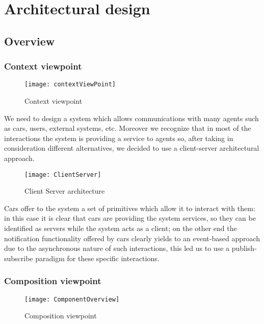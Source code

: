 \section{Architectural design}

\subsection{Overview}
	\subsubsection{Context viewpoint}
	
		\begin{figure}[h]
			\centering
			\texttt{[image: contextViewPoint]}
			\caption{
				\label{fig:contextViewPoint} 
				Context viewpoint
			}
		\end{figure}
		
		We need to design a system which allows communications with many agents such as cars, users, external systems, etc.
		Moreover we recognize that in most of the interactions the system is providing a service to agents so, after taking in consideration different alternatives, we decided to use a client-server architectural approach.

		\begin{figure}[h]
			\centering
			\texttt{[image: ClientServer]}
			\caption{
				\label{fig:ClientServer} 
				Client Server architecture
			}
		\end{figure}
		
		Cars offer to the system a set of primitives which allow it to interact with them: in this case it is clear that cars are providing the system services, so they can be identified as servers while the system acts as a client; on the other end the notification functionality offered by cars clearly yields to an event-based approach due to the asynchronous nature of such interactions, this led us to use a publish-subscribe paradigm for these specific interactions.
		\clearpage
		
		
		
	\subsubsection{Composition viewpoint}
	
		\begin{figure}[h]
			\centering
			\texttt{[image: ComponentOverview]}
			\caption{
				\label{fig:compositionViewPoint} 
				Composition viewpoint
			}
		\end{figure}
		
